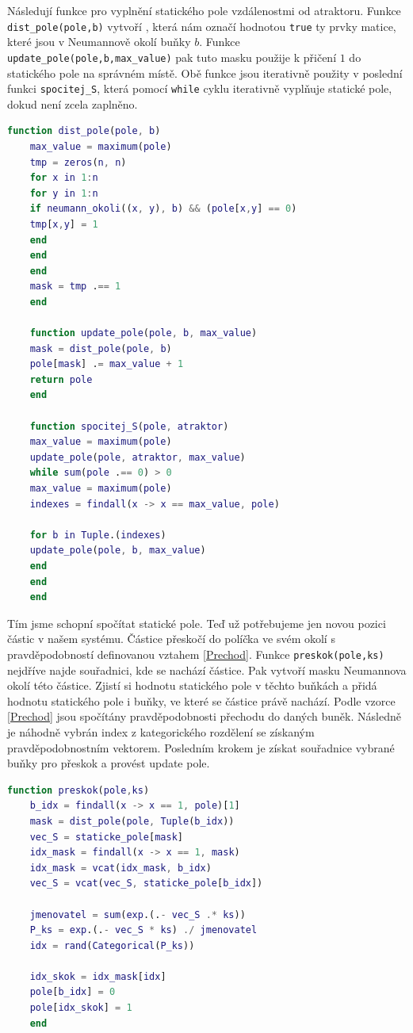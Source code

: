 \documentclass[a4paper, 12pt, fleqn]{article}
\begin{document}
	Následují funkce pro vyplnění statického pole vzdálenostmi od atraktoru. Funkce \linebreak \verb|dist_pole(pole,b)| vytvoří , která nám označí hodnotou \verb|true| ty prvky matice, které jsou v Neumannově okolí buňky $b$. Funkce \verb|update_pole(pole,b,max_value)| pak tuto masku použije k přičení $1$ do statického pole na správném místě. Obě funkce jsou iterativně použity v poslední funkci \verb|spocitej_S|, která pomocí \verb|while| cyklu iterativně vyplňuje statické pole, dokud není zcela zaplněno.
	
	\begin{lstlisting}[language=Matlab]
	function dist_pole(pole, b)
	max_value = maximum(pole)
	tmp = zeros(n, n)
	for x in 1:n
	for y in 1:n
	if neumann_okoli((x, y), b) && (pole[x,y] == 0)
	tmp[x,y] = 1
	end
	end
	end
	mask = tmp .== 1
	end
	
	function update_pole(pole, b, max_value)
	mask = dist_pole(pole, b)
	pole[mask] .= max_value + 1
	return pole
	end
	
	function spocitej_S(pole, atraktor)
	max_value = maximum(pole)
	update_pole(pole, atraktor, max_value)
	while sum(pole .== 0) > 0
	max_value = maximum(pole)
	indexes = findall(x -> x == max_value, pole)
	
	for b in Tuple.(indexes)
	update_pole(pole, b, max_value)
	end
	end
	end
	\end{lstlisting}
	
	Tím jsme schopní spočítat statické pole. Teď už potřebujeme jen novou pozici částic v našem systému. Částice přeskočí do políčka ve svém okolí s pravděpodobností definovanou vztahem \eqref{Prechod}. Funkce \verb|preskok(pole,ks)| nejdříve najde souřadnici, kde se nachází částice. Pak vytvoří masku Neumannova okolí této částice. Zjistí si hodnotu statického pole v těchto buňkách a přidá hodnotu statického pole i buňky, ve které se částice právě nachází. Podle vzorce \eqref{Prechod} jsou spočítány pravděpodobnosti přechodu do daných buněk. Následně je náhodně vybrán index z kategorického rozdělení se získaným pravděpodobnostním vektorem. Posledním krokem je získat souřadnice vybrané buňky pro přeskok a provést update pole.
	
	\begin{lstlisting}[language=Matlab]
	function preskok(pole,ks)
	b_idx = findall(x -> x == 1, pole)[1]
	mask = dist_pole(pole, Tuple(b_idx)) 
	vec_S = staticke_pole[mask]          
	idx_mask = findall(x -> x == 1, mask)
	idx_mask = vcat(idx_mask, b_idx)     
	vec_S = vcat(vec_S, staticke_pole[b_idx]) 
	
	jmenovatel = sum(exp.(.- vec_S .* ks))
	P_ks = exp.(.- vec_S * ks) ./ jmenovatel
	idx = rand(Categorical(P_ks))
	
	idx_skok = idx_mask[idx]                  
	pole[b_idx] = 0
	pole[idx_skok] = 1
	end
	\end{lstlisting}
	
\end{document}
